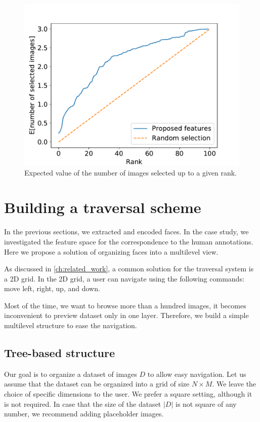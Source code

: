 \begin{figure}
    \centering
    \includegraphics[width=0.8\linewidth]{graphs/survey_cumsum_without_the_easy.pdf}
    \caption{Expected value of the number of images selected up to a given rank.}
    \label{fig:cumsum_faces}
\end{figure}

\section{Building a traversal scheme}

In the previous sections, we extracted and encoded faces. In the case study, we investigated the feature space for the correspondence to the human annotations. Here we propose a solution of organizing faces into a multilevel view. 

As discussed in \autoref{ch:related_work}, a common solution for the traversal system is a 2D grid.  In the 2D grid, a user can navigate using the following commands: move left, right, up, and down.

Most of the time, we want to browse more than a hundred images, it becomes inconvenient to preview dataset only in one layer. Therefore, we build a simple multilevel structure to ease the navigation.

\subsection{Tree-based structure}

Our goal is to organize a dataset of images $D$ to allow easy navigation. Let us assume that the dataset can be organized into a grid of size $N\times M$. We leave the choice of specific dimensions to the user. We prefer a square setting, although it is not required. In case that the size of the dataset $|D|$ is not square of any number, we recommend adding placeholder images.

